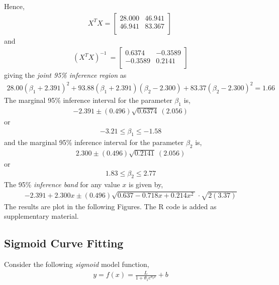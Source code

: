 Hence,
\begin{align}X^{T}X = \begin{bmatrix}
28.000 & 46.941 \\
46.941 & 83.367 \\
\end{bmatrix}\ \end{align}
and
\begin{align}\left( X^{T}X \right)^{- 1}\  = 
\begin{bmatrix}
0.6374 & - 0.3589 \\
 - 0.3589 & 0.2141 \\
\end{bmatrix}
\end{align}
giving the \emph{joint 95\% inference region} as
\begin{align}
28.00\left( \beta_{1} + 2.391 \right)^{2} + 93.88\left( \beta_{1} + 2.391 \right)\left( \beta_{2} - 2.300 \right) + 83.37\left( \beta_{2} - 2.300 \right)^{2} = 1.66
\end{align}
The marginal 95\% inference interval for the parameter \(\beta_{1}\) is,
\begin{align}
- 2.391 \pm (0.496)\sqrt{0.6374}\ (2.056)
\end{align}
or
\begin{align} 
-3.21 \leq \beta_{1} \leq - 1.58
\end{align}
and the marginal 95\% inference interval for the parameter \(\beta_{2}\)
is,
\begin{align}
2.300 \pm (0.496)\sqrt{0.2141}\ (2.056)
\end{align}
or
\begin{align}
1.83 \leq \beta_{2} \leq 2.77
\end{align}
The 95\% \emph{inference band} for any value \(x\) is given by,
\begin{align}
- 2.391 + 2.300x \pm (0.496)\sqrt{0.637 - 0.718x + 0.214x^{2}\ } \cdot \sqrt{2(3.37)}
\end{align}
The results are plot in the following Figures.
The R code is added as supplementary material.

\subsection{Sigmoid Curve Fitting}

Consider the following \emph{sigmoid} model function,
\begin{align}
y = f(x) = \frac{L}{1 + \theta_{1}e^{\theta_{2}x}} + b
\end{align}

